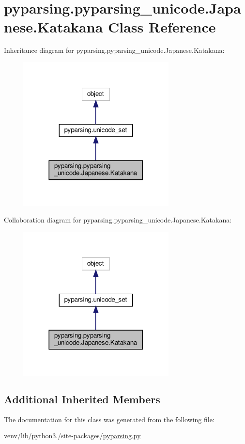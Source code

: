 \hypertarget{classpyparsing_1_1pyparsing__unicode_1_1Japanese_1_1Katakana}{}\section{pyparsing.\+pyparsing\+\_\+unicode.\+Japanese.\+Katakana Class Reference}
\label{classpyparsing_1_1pyparsing__unicode_1_1Japanese_1_1Katakana}


Inheritance diagram for pyparsing.\+pyparsing\+\_\+unicode.\+Japanese.\+Katakana\+:
\nopagebreak
\begin{figure}[H]
\begin{center}
\leavevmode
\includegraphics[width=225pt]{classpyparsing_1_1pyparsing__unicode_1_1Japanese_1_1Katakana__inherit__graph}
\end{center}
\end{figure}


Collaboration diagram for pyparsing.\+pyparsing\+\_\+unicode.\+Japanese.\+Katakana\+:
\nopagebreak
\begin{figure}[H]
\begin{center}
\leavevmode
\includegraphics[width=225pt]{classpyparsing_1_1pyparsing__unicode_1_1Japanese_1_1Katakana__coll__graph}
\end{center}
\end{figure}
\subsection*{Additional Inherited Members}


The documentation for this class was generated from the following file\+:\begin{DoxyCompactItemize}
\item 
venv/lib/python3./site-\/packages/\hyperlink{pyparsing_8py}{pyparsing.\+py}\end{DoxyCompactItemize}
